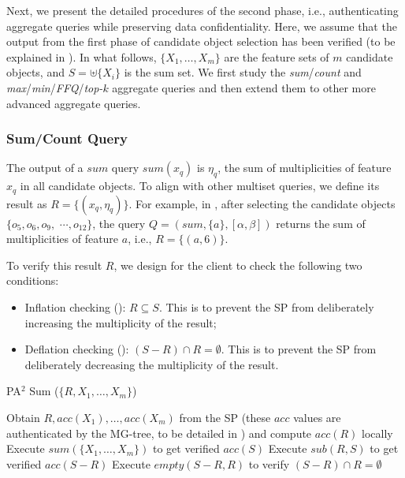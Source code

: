 Next, we present the detailed procedures of the second phase, i.e., authenticating aggregate queries while preserving data confidentiality. Here, we assume that the output from the first phase of candidate object selection has been verified (to be explained in ). In what follows, $\{X_1, \dots, X_m\}$ are the feature sets of $m$ candidate objects, and $S = \uplus \{X_i\}$ is the sum set. We first study the \emph{sum}/\emph{count} and \emph{max}/\emph{min}/\emph{FFQ}/\emph{top-$k$} aggregate queries and then extend them to other more advanced aggregate queries.

\subsubsection{Sum/Count Query}

The output of a $sum$ query $sum(x_q)$ is $\eta_q$, the sum of multiplicities of feature $x_q$ in all candidate objects. To align with other multiset queries, we define its result as $R = \{(x_q, \eta_q) \}$. For example, in , after selecting the candidate objects $\{o_5, o_6, o_9, $ $\cdots, o_{12}\}$, the query $Q = (sum, \{a\}, [\alpha, \beta])$ returns the sum of multiplicities of feature $a$, i.e., $R = \{(a, 6)\}$.

To verify this result $R$, we design  for the client to check the following two conditions:
\begin{itemize}
  \item Inflation checking (): $R \subseteq S$. This is to prevent the SP from deliberately increasing the multiplicity of the result;
  \item Deflation checking (): $(S-R) \cap R = \emptyset$. This is to prevent the SP from deliberately decreasing the multiplicity of the result.
\end{itemize}

\begin{algorithm}[t]
  \caption{PA$^2$ Sum ($\{R, X_1, \dots, X_m\}$)}\label{alg:aggregate-queries:sum}
  Obtain $R, acc(X_1), \dots, acc(X_m)$ from the SP (these $acc$ values are authenticated by the MG-tree, to be detailed in ) and compute $acc(R)$ locally\;%
  \label{alg:aggregate-queries:sum:1}
  Execute $sum(\{X_1, \dots, X_m\})$ to get verified $acc(S)$\;%
  \label{alg:aggregate-queries:sum:2}
  Execute $sub(R, S)$ to get verified $acc(S - R)$%
  \label{alg:aggregate-queries:sum:3}
  Execute $empty(S-R, R)$ to verify $(S - R) \cap R = \emptyset$\;%
  \label{alg:aggregate-queries:sum:4}
\end{algorithm}

